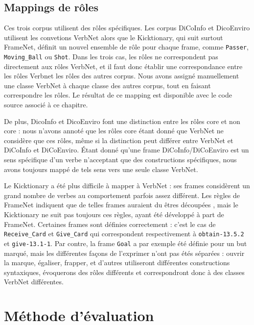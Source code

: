 \subsection{Mappings de rôles}

Ces trois corpus utilisent des rôles spécifiques. Les corpus DiCoInfo et
DicoEnviro utilisent les convetions VerbNet alors que le Kicktionary, qui suit
surtout FrameNet, définit un nouvel ensemble de rôle pour chaque frame, comme
\texttt{Passer}, \texttt{Moving\_Ball} ou \texttt{Shot}. Dans les trois cas,
les rôles ne correspondent pas directement aux rôles VerbNet, et il faut donc
établir une correspondance entre les rôles Verbnet les rôles des autres corpus.
Nous avons assigné manuellement une classe VerbNet à chaque classe des autres
corpus, tout en faisant correspondre les rôles. Le résultat de ce mapping est
disponible avec le code source associé à ce chapitre.

De plus, DicoInfo et DicoEnviro font une distinction entre les rôles core et
non core : nous n'avons annoté que les rôles core étant donné que VerbNet ne
considère que ces rôles, même si la distinction peut différer entre VerbNet et
DiCoInfo et DiCoEnviro. Étant donné qu'une frame DiCoInfo/DiCoEnviro est un
sens spécifique d'un verbe n'acceptant que des constructions spécifiques, nous
avons toujours mappé de tels sens vers une seule classe VerbNet.

Le Kicktionary a été plus difficile à mapper à VerbNet : ses frames considèrent
un grand nombre de verbes au comportement parfois assez différent. Les règles
de FrameNet indiquent que de telles frames auraient du êtres découpées
\citep{ruppenhofer2006extended}, mais le Kicktionary ne suit pas toujours ces
règles, ayant été développé à part de FrameNet. Certaines frames sont définies
correctement : c'est le cas de \texttt{Receive\_Card} et \texttt{Give\_Card}
qui correspondent respectivement à \texttt{obtain-13.5.2} et
\texttt{give-13.1-1}. Par contre, la frame \texttt{Goal} a par exemple été
définie pour un but marqué, mais les différentes façons de l'exprimer n'ont pas
étés séparées : ouvrir la marque, égaliser, frapper, et d'autres utiliseront
différentes constructions syntaxiques, évoquerons des rôles différents et
correspondront donc à des classes VerbNet différentes.

\section{Méthode d'évaluation}

